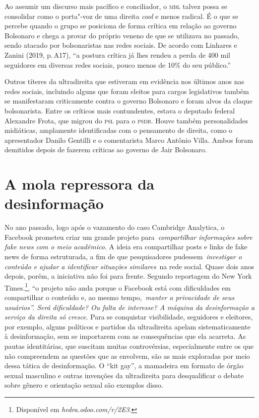 Ao assumir um discurso mais pacífico e conciliador, o \textsc{mbl} talvez possa
se consolidar como o porta"-voz de uma direita \textit{cool} e menos
radical. É o que se percebe quando o grupo se posiciona de forma crítica
em relação ao governo Bolsonaro e chega a provar do próprio veneno de
que se utilizava no passado, sendo atacado por bolsonaristas nas redes
sociais. De acordo com Linhares e Zanini (2019, p.\,A17), ``a postura
crítica já lhes rendeu a perda de 400 mil seguidores em diversas redes
sociais, pouco menos de 10\% do seu público.''

Outros títeres da ultradireita que estiveram em evidência nos últimos
anos nas redes sociais, incluindo alguns que foram eleitos para cargos
legislativos também se manifestaram criticamente contra o governo
Bolsonaro e foram alvos da claque bolsonarista. Entre os críticos mais
contundentes, estava o deputado federal Alexandre Frota, que migrou do
\textsc{psl} para o \textsc{psdb}. Houve também personalidades midiáticas, amplamente
identificadas com o pensamento de direita, como o apresentador Danilo
Gentilli e o comentarista Marco Antônio Villa. Ambos foram demitidos
depois de fazerem críticas ao governo de Jair Bolsonaro.

\section{A mola repressora da desinformação}

No ano passado, logo após o vazamento do caso Cambridge Analytica, o
Facebook prometeu criar um grande projeto para~\textit{compartilhar
informações sobre fake news com o meio acadêmico.} A ideia era
compartilhar posts e links de fake news de forma estruturada, a fim de
que pesquisadores pudessem~\textit{investigar o conteúdo e ajudar a
identificar situações similares~}na rede social. Quase dois anos depois,
porém, a iniciativa não foi para frente. Segundo reportagem do New York
Times.\footnote{Disponível em \textit{hedra.odoo.com/r/2E3}.}, ``o projeto não anda porque o Facebook está
com dificuldades em compartilhar o conteúdo e, ao mesmo
tempo,~\textit{manter a privacidade de seus usuários''. Será
dificuldade? Ou falta de interesse? A máquina da desinformação a serviço
da direita só cresce.} Para se conquistar visibilidade, seguidores e
eleitores, por exemplo, alguns políticos e partidos da ultradireita
apelam sistematicamente à desinformação, sem se importarem com as
consequências que ela acarreta. As pautas identitárias, que suscitam
muitas controvérsias, especialmente entre os que não compreendem as
questões que as envolvem, são as mais exploradas por meio dessa tática
de desinformação. O ``kit gay'', a mamadeira em formato de órgão sexual
masculino e outras invenções da ultradireita para desqualificar o debate
sobre gênero e orientação sexual são exemplos disso.

